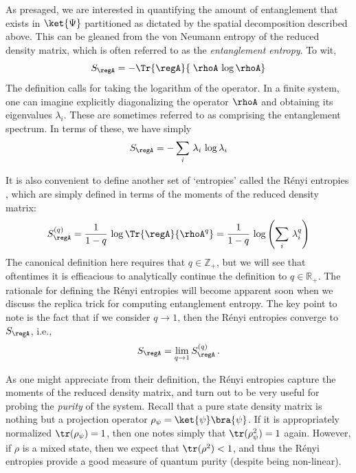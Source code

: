\documentclass[12pt,openany]{book}
\begin{document}
As presaged, we are interested in quantifying the amount of entanglement that exists in $\ket{\Psi}$ partitioned  as dictated by the spatial decomposition described above. This can be gleaned from the von Neumann entropy of the reduced density matrix, which is often referred to as the \emph{entanglement entropy}. To wit,
%
\begin{equation}
S_\regA = -\Tr{\regA}{\; \rhoA \,\log \rhoA}
\label{eq:Sadef}
\end{equation}
%
The definition calls for taking the logarithm of the operator. In a finite system, one can imagine explicitly diagonalizing the operator $\rhoA$ and obtaining its eigenvalues $\lambda_i$. These are sometimes referred to as comprising the entanglement spectrum. In terms of these, we have simply
%
\begin{equation}
S_\regA = - \sum_i \, \lambda_i \,\log \lambda_i
\label{}
\end{equation}
%


It is also convenient to define another set of `entropies' called the R\'enyi entropies
\cite{Renyi:1960fk}, which are simply defined in terms of the moments of the reduced density matrix:
%
\begin{align}
S^{(q)}_\regA = \frac{1}{1-q} \, \log \Tr{\regA}{\rhoA^q} = \frac{1}{1-q}\, \log \left(\sum_i \, \lambda_i^q\right)
\label{eq:Rendef}
\end{align}
%
The canonical definition here requires that $q\in {\mathbb Z}_+$, but we will see that oftentimes it is efficacious to analytically continue the definition to $q \in {\mathbb R}_+$.
The rationale for defining the R\'enyi entropies will become apparent soon when we discuss the replica trick for computing entanglement entropy. The key point to note is the fact that if
we consider $q \to 1$, then the R\'enyi entropies converge to $S_\regA$, i.e.,
%
\begin{align}
S_\regA  = \lim_{q \to 1} S_\regA^{(q)} \,.
\label{eq:ree}
\end{align}
%

As one might appreciate from their definition, the R\'enyi entropies capture the moments of the reduced density matrix, and turn out to be very useful for probing the
\emph{purity} of the system. Recall that a pure state density matrix is nothing but a projection operator
$\rho_\psi = \ket{\psi}\bra{\psi}$. If  it is appropriately normalized $\tr(\rho_\psi) =1$, then one notes simply that $\tr(\rho_\psi^2)=1$ again. However, if $\rho$ is a mixed state, then we expect that $\tr(\rho^2) <1$, and thus the R\'enyi entropies provide a good measure of quantum purity (despite being non-linear).
\end{document}
